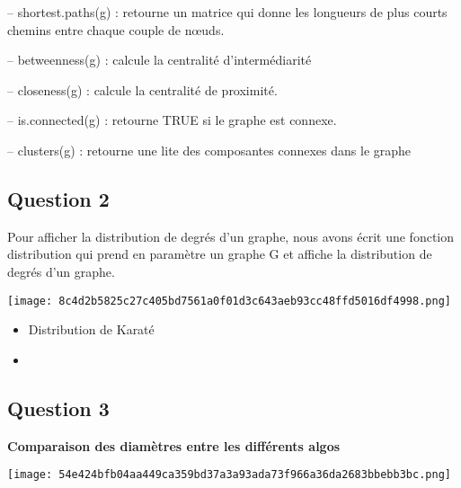 \documentclass[12pt]{report}
\begin{document}
--  shortest.paths(g) : retourne un matrice qui donne les longueurs de
plus courts chemins entre chaque couple de nœuds.

--  betweenness(g) : calcule la centralité d'intermédiarité

--  closeness(g) : calcule la centralité de proximité.

--  is.connected(g) : retourne TRUE si le graphe est connexe.

--  clusters(g) : retourne une lite des composantes connexes dans le
graphe

\subsection{Question 2}

\textbf{}

Pour afficher la distribution de degrés d'un graphe, nous avons écrit
une fonction distribution qui prend en paramètre un graphe G et affiche
la distribution de degrés d'un graphe.

\textbf{}

\begin{center} 

 \texttt{[image: 8c4d2b5825c27c405bd7561a0f01d3c643aeb93cc48ffd5016df4998.png]}


\end{center}

\begin{itemize}
\item
  Distribution de Karaté
\end{itemize}

\textbf{}

\begin{itemize}
\item
\end{itemize}

\textbf{}

\subsection{Question 3}

\textbf{Comparaison des diamètres entre les différents algos }

\textbf{}

\begin{center} 

 \texttt{[image: 54e424bfb04aa449ca359bd37a3a93ada73f966a36da2683bbebb3bc.png]}


\end{center}
\end{document}
